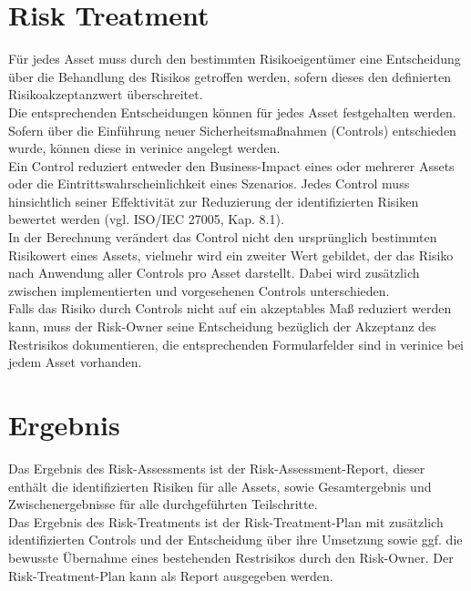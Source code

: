 \documentclass[a4paper,10pt]{book}
\begin{document}
\section{Risk Treatment}
Für jedes Asset muss durch den bestimmten Risikoeigentümer eine Entscheidung
über die Behandlung des Risikos getroffen werden, sofern dieses den definierten
Risikoakzeptanzwert überschreitet.
\newline\\
Die entsprechenden Entscheidungen können für jedes Asset festgehalten werden.
Sofern über die Einführung neuer Sicherheitsmaßnahmen (Controls) entschieden
wurde, können diese in verinice angelegt werden.
\newline\\
Ein Control reduziert entweder den Business-Impact eines oder mehrerer Assets
oder die Eintrittswahrscheinlichkeit eines Szenarios. Jedes Control muss
hinsichtlich seiner Effektivität zur Reduzierung der identifizierten Risiken
bewertet werden (vgl. ISO/IEC 27005, Kap. 8.1).
\newline\\
In der Berechnung verändert das Control nicht den ursprünglich bestimmten
Risikowert eines Assets, vielmehr wird ein zweiter Wert gebildet, der das
Risiko nach Anwendung aller Controls pro Asset darstellt. Dabei wird zusätzlich
zwischen implementierten und vorgesehenen Controls unterschieden.
\newline\\
Falls das Risiko durch Controls nicht auf ein akzeptables Maß reduziert werden
kann, muss der Risk-Owner seine Entscheidung bezüglich der Akzeptanz des
Restrisikos dokumentieren, die entsprechenden Formularfelder sind in verinice
bei jedem Asset vorhanden.

\section{Ergebnis}
Das Ergebnis des Risk-Assessments ist der Risk-Assessment-Report, dieser enthält die
identifizierten Risiken für alle Assets, sowie Gesamtergebnis und
Zwischenergebnisse für alle durchgeführten Teilschritte.
\newline\\
Das Ergebnis des Risk-Treatments ist der Risk-Treatment-Plan mit zusätzlich
identifizierten Controls und der Entscheidung über ihre Umsetzung sowie ggf.
die bewusste Übernahme eines bestehenden Restrisikos durch den Risk-Owner.
Der Risk-Treatment-Plan kann als Report ausgegeben werden.
\end{document}
